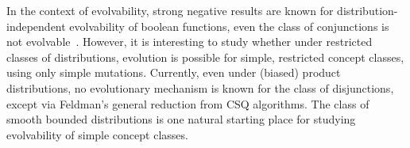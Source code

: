 In the context of evolvability, strong negative results
are known for distribution-independent evolvability of boolean functions, \eg
even the class of conjunctions is not evolvable~\cite{?}. However, it is interesting to
study whether under restricted classes of distributions, evolution is possible
for simple, restricted concept classes, using only simple mutations.
Currently, even under (biased) product
distributions, no evolutionary mechanism is known for the class of disjunctions,
except via Feldman's general reduction from CSQ algorithms. The class of
smooth bounded distributions is one natural starting place for studying
evolvability of simple concept classes.
